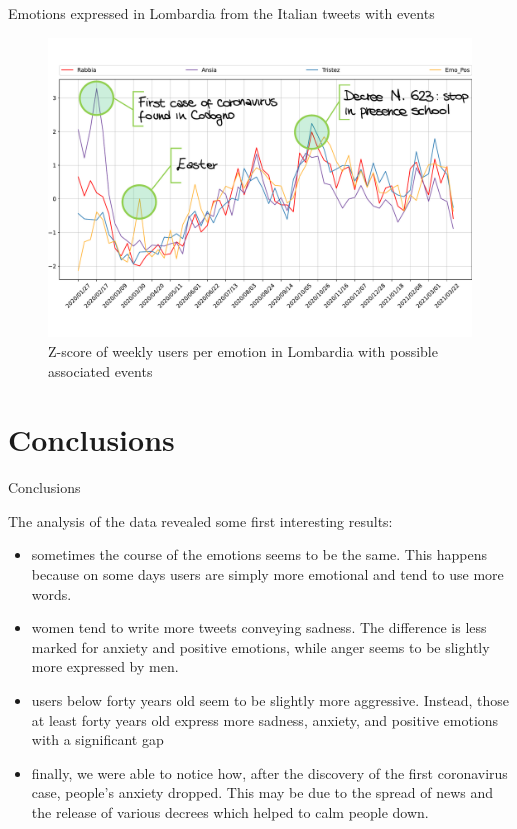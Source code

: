 \documentclass[9pt,aspectratio=1610]{beamer}  %
\begin{document}
\begin{frame}{Emotions expressed in Lombardia from the Italian tweets with events}
    
    \begin{figure}[H]
    	\centering
    	\includegraphics[scale=.38]{assets/img/it_4_categories_lombardia_events.svg.pdf}
    	\vspace*{-.75cm}
    	\caption{Z-score of weekly users per emotion in Lombardia with possible associated events}
    	\label{fig:it-4-categories-lombardia-std}
    \end{figure}

\end{frame}

\section{Conclusions}

\begin{frame}{Conclusions}
    
    The analysis of the data revealed some first interesting results:

    \begin{itemize}
    	\item sometimes the course of the emotions seems to be the same. This happens because on some days users are simply more emotional and tend to use more words.
    	\item women tend to write more tweets conveying sadness. The difference is less marked for anxiety and positive emotions, while anger seems to be slightly more expressed by men.
    	\item users below forty years old seem to be slightly more aggressive. Instead, those at least forty years old express more sadness, anxiety, and positive emotions with a significant gap
    	\item finally, we were able to notice how, after the discovery of the first coronavirus case, people's anxiety dropped. This may be due to the spread of news and the release of various decrees which helped to calm people down.
    \end{itemize}
    
\end{frame}
\end{document}
